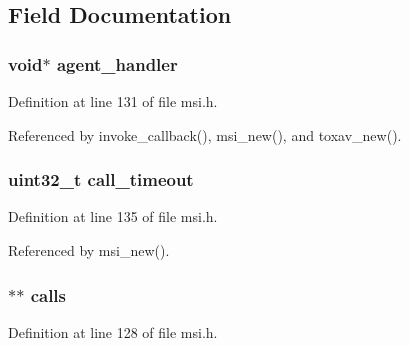 \subsection{Field Documentation}
\hypertarget{struct___m_s_i_session_ae284478ea42e8d4ed283876c3ae18c8a}{
\subsubsection[{agent\+\_\+handler}]{\setlength{\rightskip}{0pt plus 5cm}void$\ast$ agent\+\_\+handler}}\label{struct___m_s_i_session_ae284478ea42e8d4ed283876c3ae18c8a}


Definition at line 131 of file msi.\+h.



Referenced by invoke\+\_\+callback(), msi\+\_\+new(), and toxav\+\_\+new().

\hypertarget{struct___m_s_i_session_a4a61d9413f442d27898849e0d8a26720}{
\subsubsection[{call\+\_\+timeout}]{\setlength{\rightskip}{0pt plus 5cm}uint32\+\_\+t call\+\_\+timeout}}\label{struct___m_s_i_session_a4a61d9413f442d27898849e0d8a26720}


Definition at line 135 of file msi.\+h.



Referenced by msi\+\_\+new().

\hypertarget{struct___m_s_i_session_ac40fee673bae4030b812579c57389a02}{
\subsubsection[{calls}]{$\ast$$\ast$ calls}}\label{struct___m_s_i_session_ac40fee673bae4030b812579c57389a02}


Definition at line 128 of file msi.\+h.



